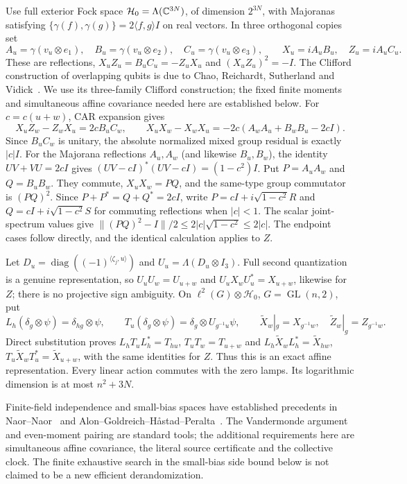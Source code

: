 Use full exterior Fock space $\mathcal H_0=\Lambda(\mathbb C^{3N})$, of dimension $2^{3N}$, with Majoranas satisfying $\{\gamma(f),\gamma(g)\}=2\langle f,g\rangle I$ on real vectors. In three orthogonal copies set
\[
 A_u=\gamma(v_u\otimes e_1),\quad B_u=\gamma(v_u\otimes e_2),\quad C_u=\gamma(v_u\otimes e_3),
 \qquad X_u=iA_uB_u,\quad Z_u=iA_uC_u.
\]
These are reflections, $X_uZ_u=B_uC_u=-Z_uX_u$ and $(X_uZ_u)^2=-I$.
The Clifford construction of overlapping qubits is due to Chao, Reichardt, Sutherland and Vidick~\cite[Theorem~3.1]{CRSV17}. We use its three-family Clifford construction; the fixed finite moments and simultaneous affine covariance needed here are established below. For $c=c(u+w)$, CAR expansion gives
\[
 X_uZ_w-Z_wX_u=2cB_uC_w,\qquad
 X_uX_w-X_wX_u=-2c(A_wA_u+B_wB_u-2cI).
\]
Since $B_uC_w$ is unitary, the absolute normalized mixed group residual is exactly $|c|I$. For the Majorana reflections $A_u,A_w$ (and likewise $B_u,B_w$), the identity $UV+VU=2cI$ gives $(UV-cI)^*(UV-cI)=(1-c^2)I$. Put $P=A_uA_w$ and $Q=B_uB_w$. They commute, $X_uX_w=PQ$, and the same-type group commutator is $(PQ)^2$. Since $P+P^*=Q+Q^*=2cI$, write $P=cI+i\sqrt{1-c^2}R$ and $Q=cI+i\sqrt{1-c^2}S$ for commuting reflections when $|c|<1$. The scalar joint-spectrum values give $\|(PQ)^2-I\|/2\le2|c|\sqrt{1-c^2}\le2|c|$. The endpoint cases follow directly, and the identical calculation applies to $Z$.

Let $D_u=\operatorname{diag}((-1)^{\langle\zeta_j,u\rangle})$ and $U_u=\Lambda(D_u\otimes I_3)$. Full second quantization is a genuine representation, so $U_uU_w=U_{u+w}$ and $U_uX_wU_u^*=X_{u+w}$, likewise for $Z$; there is no projective sign ambiguity.
On $\ell^2(G)\otimes\mathcal H_0$, $G=\operatorname{GL}(n,2)$, put
\[
 L_h(\delta_g\otimes\psi)=\delta_{hg}\otimes\psi,\qquad
 T_u(\delta_g\otimes\psi)=\delta_g\otimes U_{g^{-1}u}\psi,
 \qquad \widetilde X_w|_g=X_{g^{-1}w},\quad\widetilde Z_w|_g=Z_{g^{-1}w}.
\]
Direct substitution proves $L_hT_uL_h^*=T_{hu}$, $T_uT_w=T_{u+w}$ and
$L_h\widetilde X_wL_h^*=\widetilde X_{hw}$, $T_u\widetilde X_wT_u^*=\widetilde X_{u+w}$, with the same identities for $Z$.
Thus this is an exact affine representation. Every linear action commutes with the zero lamps. Its logarithmic dimension is at most $n^2+3N$.

Finite-field independence and small-bias spaces have established precedents in Naor--Naor~\cite{NN93} and Alon--Goldreich--H\aa stad--Peralta~\cite{AGHP92}. The Vandermonde argument and even-moment pairing are standard tools; the additional requirements here are simultaneous affine covariance, the literal source certificate and the collective clock. The finite exhaustive search in the small-bias side bound below is not claimed to be a new efficient derandomization.

